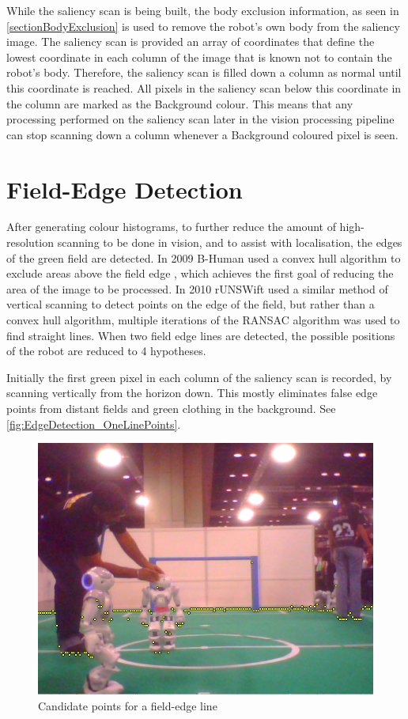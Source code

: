 \documentclass[pdftex,11pt,a4paper]{report}
\renewcommand{\vref}[1]{\autoref{#1}\vpageref{#1}}
\begin{document}
While the saliency scan is being built, the body exclusion information, as seen in \autoref{sectionBodyExclusion} is used to remove the robot's own body from the saliency image. The saliency scan is provided an array of coordinates that define the lowest coordinate in each column of the image that is known not to contain the robot's body. Therefore, the saliency scan is filled down a column as normal until this coordinate is reached. All pixels in the saliency scan below this coordinate in the column are marked as the Background colour. This means that any processing performed on the saliency scan later in the vision processing pipeline can stop scanning down a column whenever a Background coloured pixel is seen.

\label{secFieldEdgeDetection}
\section{Field-Edge Detection}
After generating colour histograms, to further reduce the amount of high-resolution scanning to be done in vision, and to assist with localisation, the edges of the green field are detected. In 2009 B-Human used a convex hull algorithm to exclude areas above the field edge \cite{thomas09code}, which achieves the first goal of reducing the area of the image to be processed. In 2010 rUNSWift used a similar method of vertical scanning to detect points on the edge of the field, but rather than a convex hull algorithm, multiple iterations of the RANSAC algorithm was used to find straight lines. When two field edge lines are detected, the possible positions of the robot are reduced to 4 hypotheses.

Initially the first green pixel in each column of the saliency scan is recorded, by scanning vertically from the horizon down. This mostly eliminates false edge points from distant fields and green clothing in the background. See \vref{fig:EdgeDetection_OneLinePoints}.

\begin{figure} [t]
\centering
\includegraphics[width=1.0\textwidth]{figures/EdgeDetection_OneLinePoints}
\caption{Candidate points for a field-edge line} \label{fig:EdgeDetection_OneLinePoints}
\end{figure}
\end{document}
